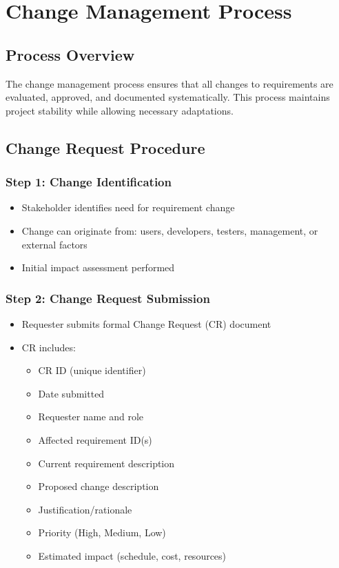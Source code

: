 \documentclass[12pt,a4paper]{article}
\begin{document}
\newpage

\section{Change Management Process}

\subsection{Process Overview}

The change management process ensures that all changes to requirements are evaluated, approved, and documented systematically. This process maintains project stability while allowing necessary adaptations.

\subsection{Change Request Procedure}

\subsubsection{Step 1: Change Identification}
\begin{itemize}
    \item Stakeholder identifies need for requirement change
    \item Change can originate from: users, developers, testers, management, or external factors
    \item Initial impact assessment performed
\end{itemize}

\subsubsection{Step 2: Change Request Submission}
\begin{itemize}
    \item Requester submits formal Change Request (CR) document
    \item CR includes:
    \begin{itemize}
        \item CR ID (unique identifier)
        \item Date submitted
        \item Requester name and role
        \item Affected requirement ID(s)
        \item Current requirement description
        \item Proposed change description
        \item Justification/rationale
        \item Priority (High, Medium, Low)
        \item Estimated impact (schedule, cost, resources)
    \end{itemize}
\end{itemize}
\end{document}
